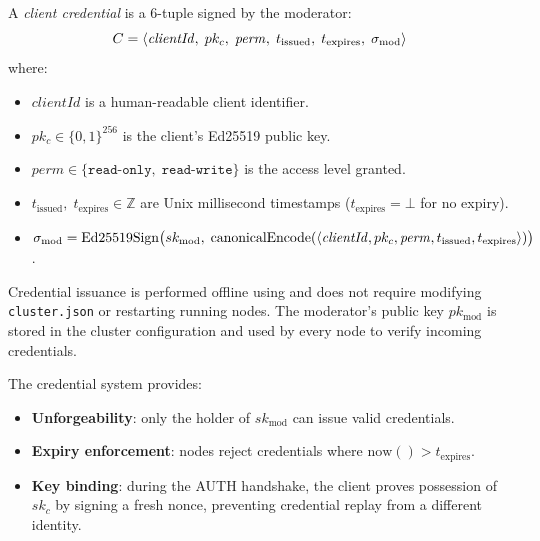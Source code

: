 \begin{definition}
\label{def:credential}
A \emph{client credential} is a 6-tuple signed by the moderator:
\[
  C = \langle \mathit{clientId},\; pk_c,\; \mathit{perm},\;
              t_{\text{issued}},\; t_{\text{expires}},\; \sigma_{\text{mod}} \rangle
\]
where:
\begin{itemize}[leftmargin=1.5em]
  \item $\mathit{clientId}$ is a human-readable client identifier.
  \item $pk_c \in \{0,1\}^{256}$ is the client's Ed25519 public key.
  \item $\mathit{perm} \in \{\texttt{read-only},\; \texttt{read-write}\}$ is
        the access level granted.
  \item $t_{\text{issued}},\; t_{\text{expires}} \in \mathbb{Z}$ are Unix
        millisecond timestamps ($t_{\text{expires}} = \bot$ for no expiry).
  \item $\sigma_{\text{mod}} = \mathrm{Ed25519Sign}\bigl(sk_{\text{mod}},\;
        \mathrm{canonicalEncode}(\langle\mathit{clientId}, pk_c, \mathit{perm},
        t_{\text{issued}}, t_{\text{expires}}\rangle)\bigr)$.
\end{itemize}
\end{definition}

Credential issuance is performed offline using  and does not
require modifying \texttt{cluster.json} or restarting running nodes. The
moderator's public key $pk_{\text{mod}}$ is stored in the cluster configuration
and used by every node to verify incoming credentials.

\begin{remark}
The credential system provides:
\begin{itemize}[leftmargin=1.5em]
  \item \textbf{Unforgeability}: only the holder of $sk_{\text{mod}}$ can issue
        valid credentials.
  \item \textbf{Expiry enforcement}: nodes reject credentials where
        $\mathrm{now}() > t_{\text{expires}}$.
  \item \textbf{Key binding}: during the AUTH handshake, the client proves
        possession of $sk_c$ by signing a fresh nonce, preventing credential
        replay from a different identity.
\end{itemize}
\end{remark}

